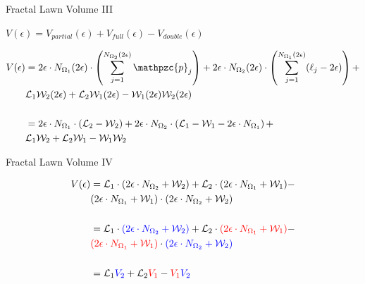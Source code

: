 \documentclass{beamer}
\newcommand{\SL}{\mathcal{L}}
\newcommand{\Om}{\Omega}
\newcommand{\W}{\mathcal{W}}
\newcommand{\p}{\mathpzc{p}}
\begin{document}
\begin{frame}{Fractal Lawn Volume III}

$V(\epsilon)=V_{partial}(\epsilon) + V_{full}(\epsilon) - V_{double}(\epsilon)$
\pause
\vspace{0.2in}

	\begin{align*}
	V(\epsilon)&=2\epsilon \cdot N_{\Om_1}(2\epsilon) \cdot \left(\sum_{j=1}^{N_{\Om_2}(2\epsilon)} \p_j \right) + 2\epsilon \cdot N_{\Om_2}(2\epsilon) \cdot \left(\sum_{j=1}^{N_{\Om_1}(2\epsilon)} (\ell_j - 2\epsilon) \right) + \\
	 &\SL_1 \W_2(2\epsilon) + \SL_2 \W_1(2\epsilon) - \W_1(2\epsilon) \W_2(2\epsilon) \\ \\
	&= 2\epsilon \cdot N_{\Om_1} \cdot (\SL_2 - \W_2) + 2\epsilon \cdot N_{\Om_2} \cdot \left( \SL_1 - \W_1 - 2\epsilon \cdot N_{\Om_1} \right) + \\
	 &\SL_1 \W_2 + \SL_2 \W_1 - \W_1 \W_2 
	\end{align*}
\end{frame}

\begin{frame}{Fractal Lawn Volume IV}
	\begin{center}
		\begin{align*}
		V(\epsilon) &= \SL_1 \cdot (2\epsilon \cdot N_{\Om_2} + \W_2) + \SL_2 \cdot (2\epsilon \cdot N_{\Om_1} + \W_1) - \\
		&(2\epsilon \cdot N_{\Om_1} + \W_1) \cdot (2\epsilon \cdot N_{\Om_2} + \W_2) \\ \\
		&= \SL_1 \cdot \textcolor{blue}{(2\epsilon \cdot N_{\Om_2} + \W_2) }+ \SL_2 \cdot \textcolor{red}{(2\epsilon \cdot N_{\Om_1} + \W_1)} - \\
		&\textcolor{red}{(2\epsilon \cdot N_{\Om_1} + \W_1)} \cdot \textcolor{blue}{(2\epsilon \cdot N_{\Om_2} + \W_2)} \\ \\
		&= \SL_1 \textcolor{blue}{V_2} + \SL_2 \textcolor{red}{V_1} - \textcolor{red}{V_1} \textcolor{blue}{V_2}
		\end{align*}
	\end{center}
\end{frame}
\end{document}
